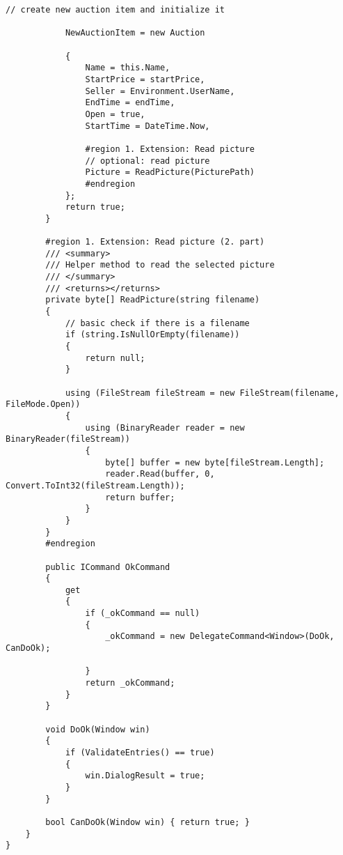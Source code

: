 \documentclass[a4paper,10pt]{scrreprt}
\begin{document}
\begin{lstlisting}[caption=ViewModel/Business logic]
            // create new auction item and initialize it

            NewAuctionItem = new Auction

            {
                Name = this.Name,
                StartPrice = startPrice,
                Seller = Environment.UserName,
                EndTime = endTime,
                Open = true,
                StartTime = DateTime.Now,

                #region 1. Extension: Read picture
                // optional: read picture
                Picture = ReadPicture(PicturePath)
                #endregion
            };
            return true;
        }

        #region 1. Extension: Read picture (2. part)
        /// <summary>
        /// Helper method to read the selected picture
        /// </summary>
        /// <returns></returns>
        private byte[] ReadPicture(string filename)
        {
            // basic check if there is a filename
            if (string.IsNullOrEmpty(filename))
            {
                return null;
            }

            using (FileStream fileStream = new FileStream(filename, FileMode.Open))
            {
                using (BinaryReader reader = new BinaryReader(fileStream))
                {
                    byte[] buffer = new byte[fileStream.Length];
                    reader.Read(buffer, 0, Convert.ToInt32(fileStream.Length));
                    return buffer;
                }
            }
        }
        #endregion

        public ICommand OkCommand
        {
            get
            {
                if (_okCommand == null)
                {
                    _okCommand = new DelegateCommand<Window>(DoOk, CanDoOk);

                }
                return _okCommand;
            }
        }

        void DoOk(Window win)
        {
            if (ValidateEntries() == true)
            {
                win.DialogResult = true;
            }
        }

        bool CanDoOk(Window win) { return true; }
    }
}
\end{lstlisting}
\end{document}
